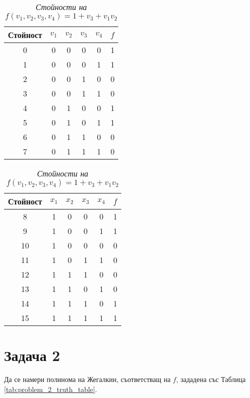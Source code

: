 \documentclass[11pt, oneside]{article}   	%
\begin{document}
\begin{table}[htbp]
    \begin{minipage}[t]{.50\textwidth}
        \begin{tabular}{cccccc}
            \toprule
            \textbf{Стойност} &\textbf{$v_1$} & \textbf{$v_2$} & \textbf{$v_3$} & \textbf{$v_4$} & \textbf{$f$}\\
            \midrule
                 0 & 0 & 0 & 0 & 0 & 1 \\
                 1 & 0 & 0 & 0 & 1 & 1 \\
                 2 & 0 & 0 & 1 & 0 & 0 \\
                 3 & 0 & 0 & 1 & 1 & 0 \\
                 4 & 0 & 1 & 0 & 0 & 1 \\
                 5 & 0 & 1 & 0 & 1 & 1 \\
                 6 & 0 & 1 & 1 & 0 & 0 \\
                 7 & 0 & 1 & 1 & 1 & 0 \\
            \bottomrule
        \end{tabular}
    \end{minipage} \hfill
    \begin{minipage}[t]{.50\textwidth}
        \begin{tabular}{cccccc}
            \toprule
                \textbf{Стойност} &\textbf{$x_1$} & \textbf{$x_2$} & \textbf{$x_3$} & \textbf{$x_4$} & \textbf{$f$} \\
            \midrule
                 8 & 1 & 0 & 0 & 0 & 1 \\
                 9 & 1 & 0 & 0 & 1 & 1 \\
                10 & 1 & 0 & 0 & 0 & 0 \\
                11 & 1 & 0 & 1 & 1 & 0 \\
                12 & 1 & 1 & 1 & 0 & 0 \\
                13 & 1 & 1 & 0 & 1 & 0 \\
                14 & 1 & 1 & 1 & 0 & 1 \\
                15 & 1 & 1 & 1 & 1 & 1 \\
            \bottomrule
        \end{tabular}
    \end{minipage} \hfill
    \caption{\textit{Стойности на $f(v_1, v_2, v_3, v_4) = 1 + v_3 + v_1v_2$}}
    \label{tab:problem_1_f_as_fun_of_4}
\end{table}

\section*{Задача 2}
\label{sec:problem_2}
Да се намери полинома на Жегалкин, съответстващ на $f$, зададена със Таблица \ref{tab:problem_2_truth_table}.
\end{document}
